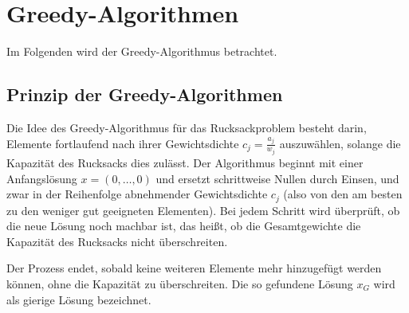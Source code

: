 \documentclass[12pt]{report}
\begin{document}
\chapter{Greedy-Algorithmen}
Im Folgenden wird der Greedy-Algorithmus betrachtet.


\section{Prinzip der Greedy-Algorithmen}
Die Idee des Greedy-Algorithmus für das Rucksackproblem besteht darin, Elemente fortlaufend nach ihrer Gewichtsdichte \( c_j = \frac{a_j}{w_j} \) auszuwählen, solange die Kapazität des Rucksacks dies zulässt. Der Algorithmus beginnt mit einer Anfangslösung \( x = (0, \ldots, 0) \) und ersetzt schrittweise Nullen durch Einsen, und zwar in der Reihenfolge abnehmender Gewichtsdichte \( c_j \) (also von den am besten zu den weniger gut geeigneten Elementen). Bei jedem Schritt wird überprüft, ob die neue Lösung noch machbar ist, das heißt, ob die Gesamtgewichte die Kapazität des Rucksacks nicht überschreiten.

Der Prozess endet, sobald keine weiteren Elemente mehr hinzugefügt werden können, ohne die Kapazität zu überschreiten. Die so gefundene Lösung \( x_G \) wird als gierige Lösung bezeichnet. \cite{diubin2003average}

\end{document}
